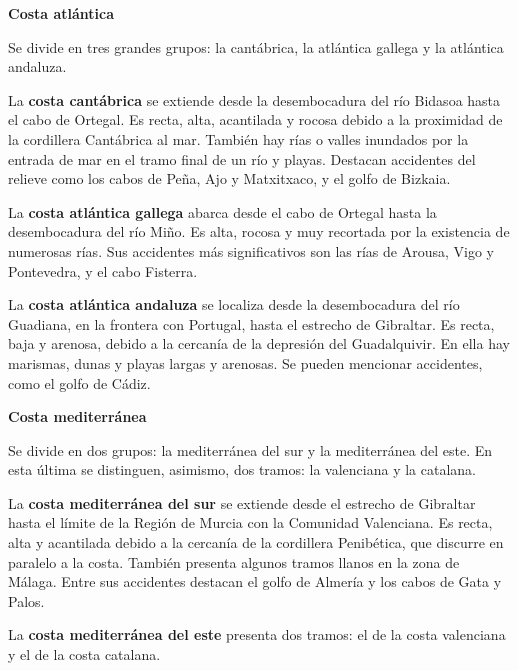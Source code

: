 \vspace{3mm}
\textbf{Costa atlántica}

\vspace{3mm}
Se divide en tres grandes grupos: la cantábrica, la atlántica gallega y la atlántica andaluza.

\vspace{3mm}
La \textbf{costa cantábrica} se extiende desde la desembocadura del río Bidasoa hasta el cabo de Ortegal. Es recta, alta, acantilada y rocosa debido a la proximidad de la cordillera Cantábrica al mar. También hay rías o valles inundados por la entrada de mar en el tramo final de un río y playas. Destacan accidentes del relieve como los cabos de Peña, Ajo y Matxitxaco, y el golfo de Bizkaia.

\vspace{3mm}
La \textbf{costa atlántica gallega} abarca desde el cabo de Ortegal hasta la desembocadura del río Miño. Es alta, rocosa y muy recortada por la existencia de numerosas rías. Sus accidentes más significativos son las rías de Arousa, Vigo y Pontevedra, y el cabo Fisterra.

\vspace{3mm}
La \textbf{costa atlántica andaluza} se localiza desde la desembocadura del río Guadiana, en la frontera con Portugal, hasta el estrecho de Gibraltar. Es recta, baja y arenosa, debido a la cercanía de la depresión del Guadalquivir. En ella hay marismas, dunas y playas largas y arenosas. Se pueden mencionar accidentes, como el golfo de Cádiz.

\vspace{3mm}
\textbf{Costa mediterránea}

\vspace{3mm}
Se divide en dos grupos: la mediterránea del sur y la mediterránea del este. En esta última se distinguen, asimismo, dos tramos: la valenciana y la catalana.

\vspace{3mm}
La \textbf{costa mediterránea del sur} se extiende desde el estrecho de Gibraltar hasta el límite de la Región de Murcia con la Comunidad Valenciana. Es recta, alta y acantilada debido a la cercanía de la cordillera Penibética, que discurre en paralelo a la costa. También presenta algunos tramos llanos en la zona de Málaga. Entre sus accidentes destacan el golfo de Almería y los cabos de Gata y Palos.

\vspace{3mm}
La \textbf{costa mediterránea del este} presenta dos tramos: el de la costa valenciana y el de la costa catalana.

